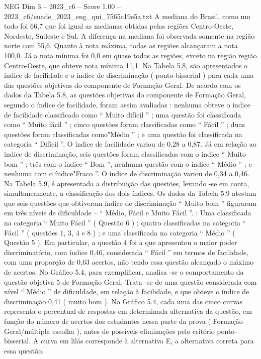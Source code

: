 \begin{textsample}{NEG Dim 3 – 2023\_c6 – Score 1.00 – 2023\_c6/enade\_2023\_eng\_qui\_7565c19e5a.txt}
A mediana do Brasil, como um todo foi 66,7 que foi igual as medianas obtidas pelas regiões Centro-Oeste, Nordeste, Sudeste e Sul.
A diferença na mediana foi observada somente na região norte com 55,6.
Quanto à nota máxima, todas as regiões alcançaram a nota 100,0.
Já a nota mínima foi 0,0 em quase todas as regiões, exceto na região região Centro-Oeste, que obteve nota mínima 11,1.
Na Tabela 5.8, são apresentados o índice de facilidade e o índice de discriminação ( ponto-bisserial ) para cada uma das questões objetivas do componente de Formação Geral.
De acordo com os dados da Tabela 5.8, as questões objetivas do componente de Formação Geral, segundo o índice de facilidade, foram assim avaliadas : nenhuma obteve o índice de facilidade classificado como “ Muito difícil ” ; uma questão foi classificada como “ Muito fácil ” ; cinco questões foram classificadas como “ Fácil ” ; duas questões foram classificadas como"Médio ” ; e uma questão foi classificada na categoria “ Difícil ”.
O índice de facilidade variou de 0,28 a 0,87.
Já em relação ao índice de discriminação, seis questões foram classificadas com o índice “ Muito bom ” ; três com o índice “ Bom ”, nenhuma questão com o índice “ Médio ” ; e nenhuma com o índice"Fraco ”.
O índice de discriminação variou de 0,34 a 0,46.
Na Tabela 5.9, é apresentada a distribuição das questões, levando -se em conta, simultaneamente, a classificação dos dois índices.
Os dados da Tabela 5.9 atestam que seis questões que obtiveram índice de discriminação “ Muito bom ” figuraram em três níveis de dificuldade – “ Médio, Fácil e Muito Fácil ”. : Uma classificada na categoria “ Muito Fácil ” ( Questão 6 ) ; quatro classificadas na categoria “ Fácil ” ( questões 1, 3, 4 e 8 ) ; e uma classificada na categoria “ Médio ” ( Questão 5 ).
Em particular, a questão 4 foi a que apresentou o maior poder discriminatório, com índice 0,46, considerada “ Fácil ” em termos de facilidade, com uma proporção de 0,63 acertos, não tendo essa questão alcançado o máximo de acertos.
No Gráfico 5.4, para exemplificar, analisa -se o comportamento da questão objetiva 5 de Formação Geral.
Trata -se de uma questão considerada com nível “ Médio ” de dificuldade, em relação à facilidade, e que obteve o índice de discriminação 0,41 ( muito bom ).
No Gráfico 5.4, cada uma das cinco curvas representa o percentual de respostas em determinada alternativa da questão, em função do número de acertos dos estudantes nessa parte da prova ( Formação Geral/múltipla escolha ), antes de possíveis eliminações pelo critério ponto-bisserial.
A curva em lilás corresponde à alternativa E, a alternativa correta para essa questão.

\end{textsample}

